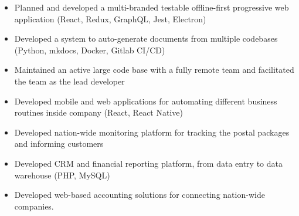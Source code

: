 \documentclass[10pt,a4paper,ragged2e,withhyper]{altacv}
\begin{document}
\divider

\begin{itemize}
\item Planned and developed a multi-branded testable offline-first progressive web application (React, Redux, GraphQL, Jest, Electron)
\item Developed a system to auto-generate documents from multiple codebases (Python, mkdocs, Docker, Gitlab CI/CD)
\item Maintained an active large code base with a fully remote team and facilitated the team as the lead developer
\end{itemize}

\divider






\begin{itemize}
\item Developed mobile and web applications for automating different business
  routines inside company (React, React Native)
\item Developed nation-wide monitoring platform for tracking the postal packages and informing customers
\end{itemize}
 
 \divider

\begin{itemize}
\item Developed CRM and financial reporting platform, from data entry
  to data warehouse (PHP, MySQL)
\item Developed web-based accounting solutions for connecting nation-wide companies.
\end{itemize} 
\end{document}
